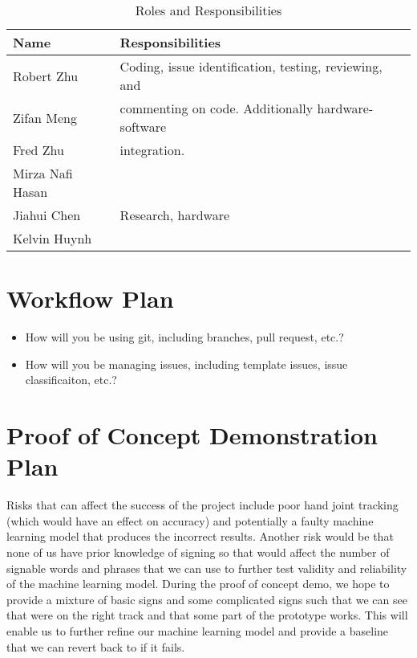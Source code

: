 \documentclass{article}
\begin{document}
\begin{table}[H]
\caption{Roles and Responsibilities} \label{TblRoles}
\begin{tabularx}{\textwidth}{ll}
\toprule
\textbf{Name} & \textbf{Responsibilities}\\
\midrule
Robert Zhu & Coding, issue identification, testing, reviewing, and \\
Zifan Meng & commenting on code. Additionally hardware-software \\
Fred Zhu & integration. \\
Mirza Nafi Hasan & \\
Jiahui Chen & Research, hardware\\
Kelvin Huynh & \\
\bottomrule
\end{tabularx}
\end{table}

\section{Workflow Plan}

\begin{itemize}
	\item How will you be using git, including branches, pull request, etc.?
	\item How will you be managing issues, including template issues, issue
	classificaiton, etc.?
\end{itemize}

\section{Proof of Concept Demonstration Plan}

Risks that can affect the success of the project include poor hand joint tracking
(which would have an effect on accuracy) and potentially a faulty machine learning model
that produces the incorrect results. Another risk would be that none of us have prior
knowledge of signing so that would affect the number of signable words and phrases that
we can use to further test validity and reliability of the machine learning model. During
the proof of concept demo, we hope to provide a mixture of basic signs and some complicated
signs such that we can see that we\textquotesingle re on the right track and that some part of the prototype
works. This will enable us to further refine our machine learning model and provide a
baseline that we can revert back to if it fails.
\end{document}
